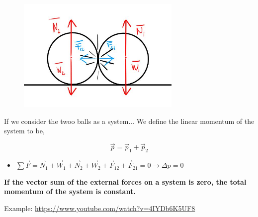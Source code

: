 \documentclass[]{beamer}
\begin{document}
\begin{frame}

    
    \begin{figure}[h!]  
        \includegraphics[width=0.7\textwidth]{images/2.jpg}
    
      \end{figure}
  
      If we consider the twoo balls as a system...
      \pause
   We define the linear momentum of the system to be,
   
   \begin{equation}
       \vec p=\vec p_1+\vec p_2
   \end{equation}
   \pause
      \begin{itemize}
        \item $\sum \vec F=\vec N_1+\vec W_1+\vec N_2+\vec W_2+\vec F_{12}+\vec F_{21}=0\rightarrow \Delta p=0$
    \end{itemize}
    
    
    
        \end{frame}



\begin{frame}

    \textbf{If the vector sum of the external forces on a system is zero, the total momentum
of the system is constant.}


\vspace{5mm}

Example: \url{https://www.youtube.com/watch?v=4IYDb6K5UF8}
    
        \end{frame}
        




        
\end{document}
